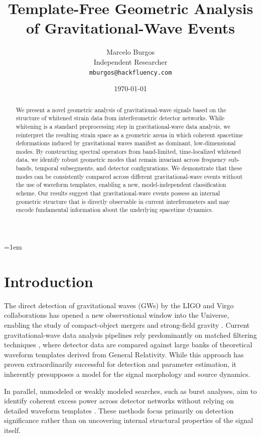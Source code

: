 \documentclass[11pt,a4paper]{article}
\title{\textbf{Template-Free Geometric Analysis of Gravitational-Wave Events}}
\author{
Marcelo Burgos\\
\small Independent Researcher\\
\small \texttt{mburgos@hackfluency.com}
}
\date{\today}
\begin{document}
\sloppy
\emergencystretch=1em

\maketitle

\begin{abstract}

We present a novel geometric analysis of gravitational-wave signals based on the structure of whitened strain data from interferometric detector networks. While whitening is a standard preprocessing step in gravitational-wave data analysis, we reinterpret the resulting strain space as a geometric arena in which coherent spacetime deformations induced by gravitational waves manifest as dominant, low-dimensional modes. By constructing spectral operators from band-limited, time-localized whitened data, we identify robust geometric modes that remain invariant across frequency sub-bands, temporal subsegments, and detector configurations. We demonstrate that these modes can be consistently compared across different gravitational-wave events without the use of waveform templates, enabling a new, model-independent classification scheme. Our results suggest that gravitational-wave events possess an internal geometric structure that is directly observable in current interferometers and may encode fundamental information about the underlying spacetime dynamics.

\end{abstract}

\section{Introduction}

The direct detection of gravitational waves (GWs) by the LIGO and Virgo collaborations has opened a new observational window into the Universe, enabling the study of compact-object mergers and strong-field gravity \cite{Abbott2016, Bailes2021}. Current gravitational-wave data analysis pipelines rely predominantly on matched filtering techniques \cite{Creighton2011, Usman2016}, where detector data are compared against large banks of theoretical waveform templates derived from General Relativity. While this approach has proven extraordinarily successful for detection and parameter estimation, it inherently presupposes a model for the signal morphology and source dynamics.

In parallel, unmodeled or weakly modeled searches, such as burst analyses, aim to identify coherent excess power across detector networks without relying on detailed waveform templates \cite{Klimenko2016, Sutton2010, Abbott2021BurstO3}. These methods focus primarily on detection significance rather than on uncovering internal structural properties of the signal itself.
\end{document}
